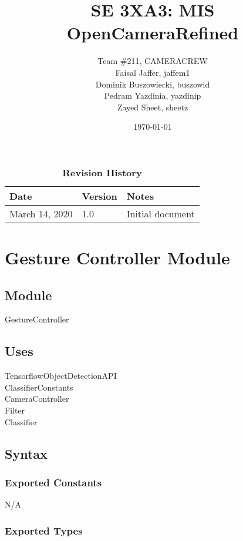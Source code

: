 \documentclass[12pt, titlepage]{article}
\title{SE 3XA3: MIS\\OpenCameraRefined}
\author{Team \#211, CAMERACREW
		\\ Faisal Jaffer, jaffem1
		\\ Dominik Buszowiecki, buszowid
		\\ Pedram Yazdinia, yazdinip
		\\ Zayed Sheet, sheetz
}
\date{\today}
\begin{document}
\maketitle


\begin{table}[hp]
\caption{\bf Revision History}
\begin{tabularx}{\textwidth}{p{3cm}p{2cm}X}
\toprule {\bf Date} & {\bf Version} & {\bf Notes}\\
\midrule
March 14, 2020 & 1.0 & Initial document\\
\bottomrule
\end{tabularx}
\end{table}

\newpage

\section* {Gesture Controller Module}

\subsection*{Module}

GestureController

\subsection* {Uses}

TensorflowObjectDetectionAPI \\
ClassifierConstants \\
CameraController \\
Filter \\
Classifier

\subsection* {Syntax}

\subsubsection* {Exported Constants}

N/A

\subsubsection* {Exported Types}
\end{document}
